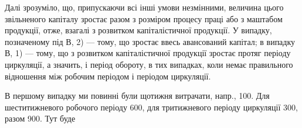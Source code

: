 Далі зрозуміло, що, припускаючи всі інші умови незмінними, величина
цього звільненого капіталу зростає разом з розміром процесу праці
або з маштабом продукції, отже, взагалі з розвитком капіталістичної
продукції. У випадку, позначеному під В, 2) — тому, що зростає ввесь
авансований капітал; в випадку В, 1) — тому, що з розвитком капіталістичної
продукції зростає протяг періоду циркуляції, а значить, і період
обороту, в тих випадках, коли немає правильного відношення між робочим
періодом і періодом циркуляції.

В першому випадку ми повинні були щотижня витрачати, напр.,
100. Для шеститижневого робочого періоду 600, для тритижневого
періоду циркуляції 300, разом 900. Тут буде
\parbreak{}  %
